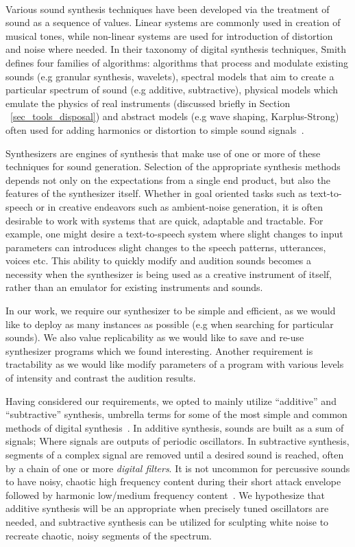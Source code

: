 \documentclass[\main/thesis.tex]{subfiles}
\begin{document}
\\

Various sound synthesis techniques have been developed via the treatment of sound as a sequence of values. Linear systems are commonly used in creation of musical tones, while non-linear systems are used for introduction of distortion and noise where needed. In their taxonomy of digital synthesis techniques, Smith defines four families of algorithms: algorithms that process and modulate existing sounds (e.g granular synthesis, wavelets), spectral models that aim to create a particular spectrum of sound (e.g additive, subtractive), physical models which emulate the physics of real instruments (discussed briefly in Section ~\ref{sec_tools_disposal}) and abstract models (e.g wave shaping, Karplus-Strong) often used for adding harmonics or distortion to simple sound signals~\cite{smith1991viewpoints}. 

Synthesizers are engines of synthesis that make use of one or more of these techniques for sound generation. Selection of the appropriate synthesis methods depends not only on the expectations from a single end product, but also the features of the synthesizer itself. Whether in goal oriented tasks such as text-to-speech or in creative endeavors such as ambient-noise generation, it is often desirable to work with systems that are quick, adaptable and tractable. For example, one might desire a text-to-speech system where slight changes to input parameters can introduces slight changes to the speech patterns, utterances, voices etc. This ability to quickly modify and audition sounds becomes a necessity when the synthesizer is being used as a creative instrument of itself, rather than an emulator for existing instruments and sounds. 

In our work, we require our synthesizer to be simple and efficient, as we would like to deploy as many instances as possible (e.g when searching for particular sounds). We also value replicability as we would like to save and re-use synthesizer programs which we found interesting. Another requirement is tractability as we would like modify parameters of a program with various levels of intensity and contrast the audition results.

Having considered our requirements, we opted to mainly utilize \enquote{additive} and \enquote{subtractive} synthesis, umbrella terms for some of the most simple and common methods of digital synthesis~\cite{mitchell2009basicsynthChap1}. 
In additive synthesis, sounds are built as a sum of signals; Where signals are outputs of periodic oscillators.  In subtractive synthesis, segments of a complex signal are removed until a desired sound is reached, often by a chain of one or more \textit{digital filters}. It is not uncommon for percussive sounds to have noisy, chaotic high frequency content during their short attack envelope followed by harmonic low/medium frequency content~\cite{lakatos2000common}. We hypothesize that additive synthesis will be an appropriate when precisely tuned oscillators are needed, and subtractive synthesis can be utilized for sculpting white noise to recreate chaotic, noisy segments of the spectrum. 
\end{document}
